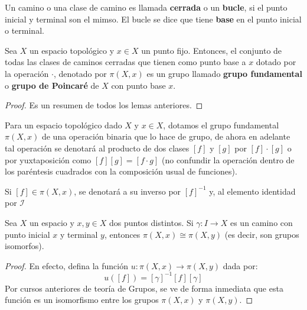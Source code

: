 \documentclass[12pt]{report}
\theoremstyle{largebreak}
\newcommand\cf[3]{\ensuremath{#1:#2\rightarrow#3}}
\begin{document}
    \begin{mydef}
        Un camino o una clase de camino es llamada \textbf{cerrada} o un \textbf{bucle}, si el punto inicial y terminal son el mimso. El bucle se dice que tiene \textbf{base} en el punto inicial o terminal.
    \end{mydef}

    \begin{theor}
        Sea $X$ un espacio topológico y $x\in X$ un punto fijo. Entonces, el conjunto de todas las clases de caminos cerradas que tienen como punto base a $x$ dotado por la operación $\cdot$, denotado por $\pi(X,x)$ es un grupo llamado \textbf{grupo fundamental} o \textbf{grupo de Poincaré} de $X$ con punto base $x$.
    \end{theor}

    \begin{proof}
        Es un resumen de todos los lemas anteriores.
    \end{proof}

    \begin{obs}
        Para un espacio topológico dado $X$ y $x\in X$, dotamos el grupo fundamental $\pi(X,x)$ de una operación binaria que lo hace de grupo, de ahora en adelante tal operación se denotará al producto de dos clases $[f]$ y $[g]$ por $[f]\cdot[g]$ o por yuxtaposición como $[f][g]=[f\cdot g]$ (no confundir la operación dentro de los paréntesis cuadrados con la composición usual de funciones).

        Si $[f]\in\pi(X,x)$, se denotará a su inverso por $[f]^{-1}$ y, al elemento identidad por $\mathscr{I}$
    \end{obs}

    \begin{propo}
        Sea $X$ un espacio y $x,y\in X$ dos puntos distintos. Si $\cf{\gamma}{I}{X}$ es un camino con punto inicial $x$ y terminal $y$, entonces $\pi(X,x)\cong\pi(X,y)$ (es decir, son grupos isomorfos).
    \end{propo}

    \begin{proof}
        En efecto, defina la función $\cf{u}{\pi(X,x)}{\pi(X,y)}$ dada por:
        \begin{equation*}
            u([f])=[\gamma]^{-1}[f][\gamma]
        \end{equation*}
        Por cursos anteriores de teoría de Grupos, se ve de forma inmediata que esta función es un isomorfismo entre los grupos $\pi(X,x)$ y $\pi(X,y)$.
    \end{proof}
\end{document}
